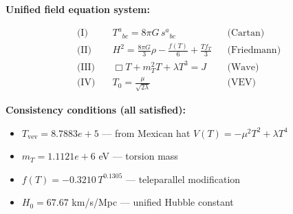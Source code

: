 
\textbf{Unified field equation system:}

\begin{align}
  \text{(I)} \quad & T^a{}_{bc} = 8\pi G \, s^a{}_{bc} && \text{(Cartan)} \\
  \text{(II)} \quad & H^2 = \frac{8\pi G}{3}\rho - \frac{f(T)}{6} + \frac{Tf_T}{3} && \text{(Friedmann)} \\
  \text{(III)} \quad & \Box T + m_T^2 T + \lambda T^3 = J && \text{(Wave)} \\
  \text{(IV)} \quad & T_0 = \frac{\mu}{\sqrt{2\lambda}} && \text{(VEV)}
\end{align}

\textbf{Consistency conditions (all satisfied):}
\begin{itemize}
  \item $T_{\text{vev}} = 8.7883e+5$ — from Mexican hat $V(T) = -\mu^2 T^2 + \lambda T^4$
  \item $m_T = 1.1121e+6$ eV — torsion mass
  \item $f(T) = -0.3210 \, T^{0.1305}$ — teleparallel modification
  \item $H_0 = 67.67$ km/s/Mpc — unified Hubble constant
\end{itemize}
